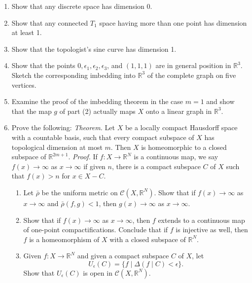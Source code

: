 \begin{enumerate}[itemsep=0.4em, parsep=0pt, topsep=0pt, partopsep=0pt, leftmargin=*, label=\arabic*., ref=\arabic*]
\item Show that any discrete space has dimension 0.
\item Show that any connected \(T_{1}\) space having more than one point has dimension at least 1.
\item Show that the topologist's sine curve has dimension 1.
\item Show that the points \(0,{\epsilon }_{1},{\epsilon }_{2},{\epsilon }_{3}\), and \((1,1,1)\) are in general position in \(\mathbb{R}^{3}\). Sketch the corresponding imbedding into \(\mathbb{R}^{3}\) of the complete graph on five vertices.
\item Examine the proof of the imbedding theorem in the case \(m = 1\) and show that the map \(g\) of part (2) actually maps \(X\) onto a linear graph in \(\mathbb{R}^{3}\).
\item Prove the following: \textsl{Theorem.} Let \(X\) be a locally compact Hausdorff space with a countable basis, such that every compact subspace of \(X\) has topological dimension at most \(m\). Then \(X\) is homeomorphic to a closed subspace of \(\mathbb{R}^{{2m} + 1}\). \textsl{Proof.} If \(f : X \rightarrow {\mathbb{R}}^{N}\) is a continuous map, we say \(f(x) \rightarrow \infty\) as \(x \rightarrow \infty\) if given \(n\), there is a compact subspace \(C\) of \(X\) such that \(f(x) > n\) for \(x \in X - C\).
 \begin{enumerate}[itemsep=0.2em, parsep=0pt, topsep=0pt, partopsep=0pt, leftmargin=*, label=(\alph*), align=left]
 \item Let \(\bar{\rho }\) be the uniform metric on \(\mathcal{C}({X,\mathbb{R}^{N}})\). Show that if \(f(x) \rightarrow \infty\) as \(x \rightarrow \infty\) and \(\bar{\rho }({f,g}) < 1\), then \(g(x) \rightarrow \infty\) as \(x \rightarrow \infty\).
 \item Show that if \(f(x) \rightarrow \infty\) as \(x \rightarrow \infty\), then \(f\) extends to a continuous map of one-point compactifications. Conclude that if \(f\) is injective as well, then \(f\) is a homeomorphism of \(X\) with a closed subspace of \(\mathbb{R}^{N}\).
 \item Given \(f : X \rightarrow {\mathbb{R}}^{N}\) and given a compact subspace \(C\) of \(X\), let \[ U_{\epsilon }( C) = \{ f \mid \Delta ({f \mid C}) < \epsilon \}. \] Show that \(U_{\epsilon }( C)\) is open in \(\mathcal{C}({X,\mathbb{R}^{N}})\).

\end{enumerate}
\end{enumerate}
